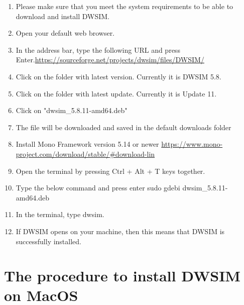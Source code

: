 \documentclass[12pt,a4paper]{article}
\begin{document}
\begin{enumerate}
\item Please make sure that you meet the system requirements to be able to download and install DWSIM.
\item Open your default web browser.
\item In the address bar, type the following URL and press Enter.\newline \url{https://sourceforge.net/projects/dwsim/files/DWSIM/}

\item Click on the folder with latest version. Currently it is DWSIM 5.8.

\item Click on the folder with latest update. Currently it is Update 11.
\item Click on "dwsim\_5.8.11-amd64.deb"
\item The file will be downloaded and saved in the default downloads folder
\item Install Mono Framework version 5.14 or newer
\newline \url{https://www.mono-project.com/download/stable/#download-lin}

\item Open the terminal by pressing Ctrl + Alt + T keys together.

\item Type the below command and press enter
\newline sudo gdebi dwsim\_5.8.11-amd64.deb

\item In the terminal, type dwsim.
\item If DWSIM opens on your machine, then this means that DWSIM is successfully installed.

\end{enumerate}

\section{The procedure to install DWSIM on MacOS}
\end{document}
